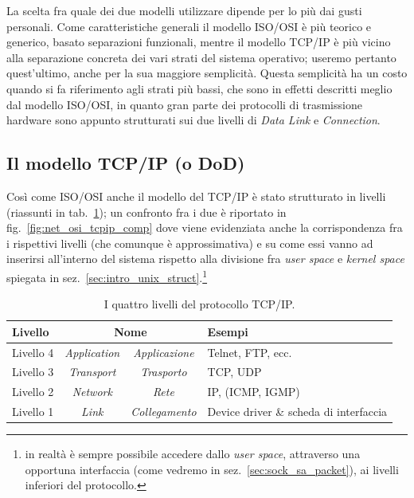 La scelta fra quale dei due modelli utilizzare dipende per lo più dai gusti
personali. Come caratteristiche generali il modello ISO/OSI è più teorico e
generico, basato separazioni funzionali, mentre il modello TCP/IP è più vicino
alla separazione concreta dei vari strati del sistema operativo; useremo
pertanto quest'ultimo, anche per la sua maggiore semplicità. Questa semplicità
ha un costo quando si fa riferimento agli strati più bassi, che sono in
effetti descritti meglio dal modello ISO/OSI, in quanto gran parte dei
protocolli di trasmissione hardware sono appunto strutturati sui due livelli
di \textit{Data Link} e \textit{Connection}.


\subsection{Il modello TCP/IP (o DoD)}
\label{sec:net_tcpip_overview}

Così come ISO/OSI anche il modello del TCP/IP è stato strutturato in livelli
(riassunti in tab.~\ref{tab:net_layers}); un confronto fra i due è riportato
in fig.~\ref{fig:net_osi_tcpip_comp} dove viene evidenziata anche la
corrispondenza fra i rispettivi livelli (che comunque è approssimativa) e su
come essi vanno ad inserirsi all'interno del sistema rispetto alla divisione
fra \textit{user space} e \textit{kernel space} spiegata in
sez.~\ref{sec:intro_unix_struct}.\footnote{in realtà è sempre possibile
  accedere dallo \textit{user space}, attraverso una opportuna interfaccia
  (come vedremo in sez.~\ref{sec:sock_sa_packet}), ai livelli inferiori del
  protocollo.}

\begin{table}[htb]
  \centering
  \begin{tabular}{|l|c|c|l|} 
    \hline
    \textbf{Livello} & \multicolumn{2}{|c|}{\textbf{Nome}} & \textbf{Esempi} \\
    \hline
    \hline
    Livello 4 & \textit{Application} & \textsl{Applicazione}& 
                                       Telnet, FTP, ecc. \\ 
    Livello 3 & \textit{Transport}   & \textsl{Trasporto} & TCP, UDP\\ 
    Livello 2 & \textit{Network}     & \textsl{Rete}      & IP, (ICMP, IGMP)\\ 
    Livello 1 & \textit{Link}        & \textsl{Collegamento}& 
                                       Device driver \& scheda di interfaccia\\
    \hline
\end{tabular}
\caption{I quattro livelli del protocollo TCP/IP.}
\label{tab:net_layers}
\end{table}

